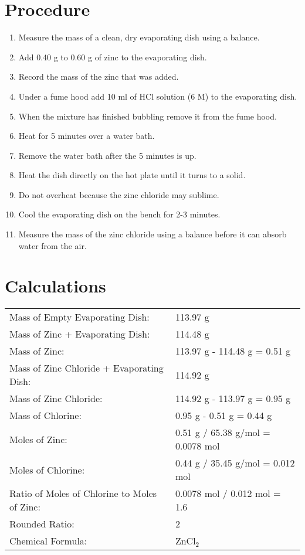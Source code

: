 \documentclass[12pt]{article}
\begin{document}
    \section*{Procedure}
    \begin{enumerate}
        \item Measure the mass of a clean, dry evaporating dish using a balance.
        \item Add 0.40 g to 0.60 g of zinc to the evaporating dish.
        \item Record the mass of the zinc that was added.
        \item Under a fume hood add 10 ml of HCl solution (6 M) to the evaporating dish.
        \item When the mixture has finished bubbling remove it from the fume hood.
        \item Heat for 5 minutes over a water bath.
        \item Remove the water bath after the 5 minutes is up.
        \item Heat the dish directly on the hot plate until it turns to a solid.
        \item Do not overheat because the zinc chloride may sublime.
        \item Cool the evaporating dish on the bench for 2-3 minutes.
        \item Measure the mass of the zinc chloride using a balance before it can absorb water from the air.
    \end{enumerate}
    \section*{Calculations}
        \begin{tabular}{ll}
            Mass of Empty Evaporating Dish:& 113.97 g\\
            Mass of Zinc + Evaporating Dish:& 114.48 g\\
            Mass of Zinc:& 113.97 g - 114.48 g = 0.51 g\\
            Mass of Zinc Chloride + Evaporating Dish:& 114.92 g\\
            Mass of Zinc Chloride:& 114.92 g - 113.97 g = 0.95 g\\
            Mass of Chlorine:& 0.95 g - 0.51 g = 0.44 g\\
            Moles of Zinc:& 0.51 g / 65.38 g/mol = 0.0078 mol\\
            Moles of Chlorine:& 0.44 g / 35.45 g/mol = 0.012 mol\\
            Ratio of Moles of Chlorine to Moles of Zinc:& 0.0078 mol / 0.012 mol = 1.6\\
            Rounded Ratio:& 2\\
            Chemical Formula:& ZnCl\(_2\)\\
        \end{tabular}
\end{document}
